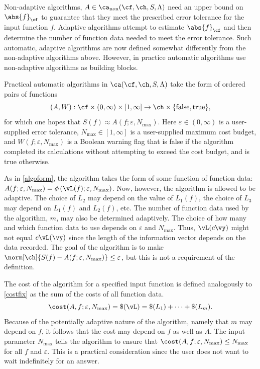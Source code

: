 \documentclass[]{elsarticle}
\DeclareMathOperator{\fix}{non}
\theoremstyle{definition}
\theoremstyle{remark}
\newcommand{\Fnorm}[1]{\abs{#1}_{\cf}}
\begin{document}
Non-adaptive algorithms, $A \in \ca_{\fix}(\cf,\ch,S,\Lambda)$ need an upper bound on $\Fnorm{f}$ to guarantee that they meet the prescribed error tolerance for the input function $f$.  Adaptive algorithms attempt to estimate $\Fnorm{f}$ and then determine the number of function data needed to meet the error tolerance.  Such automatic, adaptive algorithms are now defined somewhat differently from the non-adaptive algorithms above.  However, in practice automatic algorithms use non-adaptive algorithms as building blocks.

Practical automatic algorithms in $\ca(\cf,\ch,S,\Lambda)$ take the form of ordered pairs of functions
\[
(A,W): \cf \times (0,\infty)\times [1,\infty] \to \ch \times \{\text{false},\text{true}\},
\]
for which one hopes that $S(f) \approx A(f;\varepsilon,N_{\max})$.  Here $\varepsilon \in (0,\infty)$ is a user-supplied error tolerance, $N_{\max} \in [1,\infty]$ is a user-supplied maximum cost budget, and $W(f;\varepsilon,N_{\max})$ is a Boolean warning flag that is false if the algorithm completed its calculations without attempting to exceed the cost budget, and is true otherwise.  

As in \eqref{algoform}, the algorithm takes the form of some function of function data: $A(f;\varepsilon,N_{\max}) = \phi\left(\vL(f);\varepsilon,N_{\max}\right)$.
Now, however, the algorithm is allowed to be adaptive. The choice of $L_2$ may depend on the value of $L_1(f)$, the choice of $L_3$ may depend on $L_1(f)$ and $L_2(f)$, etc.  The number of function data used by the algorithm, $m$, may also be determined adaptively. The choice of how many and which function data to use depends on $\varepsilon$ and $N_{\max}$.  Thus, $\vL(c\vy)$ might not equal $c\vL(\vy)$ since the length of the information vector depends on the data recorded.  The goal of the algorithm is to make $\norm[\ch]{S(f) - A(f;\varepsilon,N_{\max})} \le \varepsilon$, but this is not a requirement of the definition.

The cost of the algorithm for a specified input function is defined analogously to \eqref{costfix} as the sum of the costs of all function data.
\[
\cost(A,f;\varepsilon,N_{\max}) = \$(\vL) = \$(L_1) + \cdots +\$(L_m).
\]
Because of the potentially adaptive nature of the algorithm, namely that $m$ may depend on $f$, it follows that the cost may depend on $f$ as well as $A$. The input parameter $N_{\max}$ tells the algorithm to ensure that $\cost(A,f;\varepsilon,N_{\max}) \le N_{\max}$ for all $f$ and $\varepsilon$.  This is a practical consideration since the user does not want to wait indefinitely for an answer.  
\end{document}
